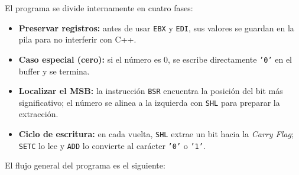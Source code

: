\documentclass[12pt, letterpaper]{article}
\begin{document}
El programa se divide internamente en cuatro fases:

\begin{itemize}
    \item \textbf{Preservar registros:} antes de usar \texttt{EBX} y \texttt{EDI}, sus valores se guardan en la pila para no interferir con C++.
    \item \textbf{Caso especial (cero):} si el número es 0, se escribe directamente \texttt{'0'} en el buffer y se termina.
    \item \textbf{Localizar el MSB:} la instrucción \texttt{BSR} encuentra la posición del bit más significativo; el número se alinea a la izquierda con \texttt{SHL} para preparar la extracción.
    \item \textbf{Ciclo de escritura:} en cada vuelta, \texttt{SHL} extrae un bit hacia la \textit{Carry Flag}; \texttt{SETC} lo lee y \texttt{ADD} lo convierte al carácter \texttt{'0'} o \texttt{'1'}.
\end{itemize}

El flujo general del programa es el siguiente:
\end{document}
